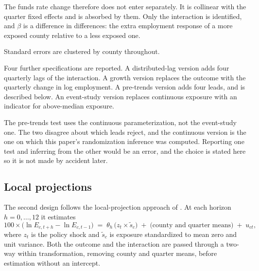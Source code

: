 The funds rate change therefore does not enter separately. It is collinear with
the quarter fixed effects and is absorbed by them. Only the interaction is
identified, and $\beta$ is a difference in differences: the extra employment
response of a more exposed county relative to a less exposed one.

Standard errors are clustered by county throughout.

Four further specifications are reported. A distributed-lag version adds four
quarterly lags of the interaction. A growth version replaces the outcome with
the quarterly change in log employment. A pre-trends version adds four leads,
and is described below. An event-study version replaces continuous exposure
with an indicator for above-median exposure.

The pre-trends test uses the continuous parameterization, not the event-study
one. The two disagree about which leads reject, and the continuous version is
the one on which this paper's randomization inference was computed. Reporting
one test and inferring from the other would be an error, and the choice is
stated here so it is not made by accident later.

\subsection{Local projections}

The second design follows the local-projection approach of \citet{jorda2005}. At
each horizon $h=0,\dots,12$ it estimates
%
\begin{equation}
100 \times \bigl(\ln E_{c,t+h} - \ln E_{c,t-1}\bigr)
\;=\; \theta_h \,\bigl(z_t \times \tilde{s}_c\bigr) \;+\; \text{(county and quarter means)} \;+\; u_{ct},
\label{eq:lp}
\end{equation}
%
where $z_t$ is the policy shock and $\tilde{s}_c$ is exposure standardized to
mean zero and unit variance. Both the outcome and the interaction are passed
through a two-way within transformation, removing county and quarter means,
before estimation without an intercept.

